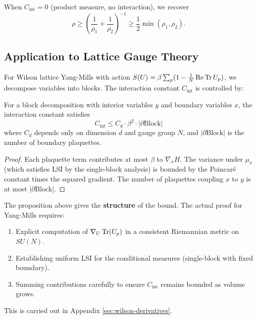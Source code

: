 \begin{corollary}
When $C_{\mathrm{int}} = 0$ (product measure, no interaction), we recover
\begin{equation}
    \rho \geq \left( \frac{1}{\rho_1} + \frac{1}{\rho_2} \right)^{-1} \geq \frac{1}{2} \min(\rho_1, \rho_2).
\end{equation}
\end{corollary}

\subsection{Application to Lattice Gauge Theory}

For Wilson lattice Yang-Mills with action $S(U) = \beta \sum_p (1 - \frac{1}{N} \operatorname{Re} \operatorname{Tr} U_p)$, we decompose variables into blocks. The interaction constant $C_{\mathrm{int}}$ is controlled by:

\begin{proposition}\label{prop:ym-interaction}
For a block decomposition with interior variables $y$ and boundary variables $x$, the interaction constant satisfies
\begin{equation}
    C_{\mathrm{int}} \leq C_d \cdot \beta^2 \cdot |\partial \text{Block}|
\end{equation}
where $C_d$ depends only on dimension $d$ and gauge group $N$, and $|\partial \text{Block}|$ is the number of boundary plaquettes.
\end{proposition}

\begin{proof}
Each plaquette term contributes at most $\beta$ to $\nabla_x H$. The variance under $\mu_x$ (which satisfies LSI by the single-block analysis) is bounded by the Poincar\'e constant times the squared gradient. The number of plaquettes coupling $x$ to $y$ is at most $|\partial \text{Block}|$.
\end{proof}

\begin{remark}
The proposition above gives the \textbf{structure} of the bound. The actual proof for Yang-Mills requires:
\begin{enumerate}
    \item Explicit computation of $\nabla_U \operatorname{Tr}(U_p)$ in a consistent Riemannian metric on $SU(N)$.
    \item Establishing uniform LSI for the conditional measures (single-block with fixed boundary).
    \item Summing contributions carefully to ensure $C_{\mathrm{int}}$ remains bounded as volume grows.
\end{enumerate}
This is carried out in Appendix \ref{sec:wilson-derivatives}.
\end{remark}



